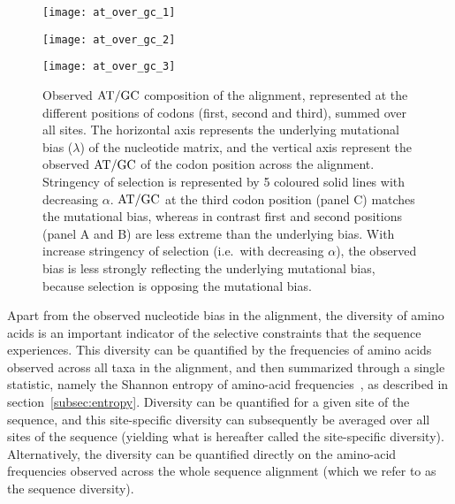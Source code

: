 \begin{figure}[htbp]
    \centering
    \begin{minipage}{0.32\linewidth}
        \texttt{[image: at\_over\_gc\_1]}
    \end{minipage}
    \hfill
    \begin{minipage}{0.32\linewidth}
        \texttt{[image: at\_over\_gc\_2]}
    \end{minipage}
    \hfill
    \begin{minipage}{0.32\linewidth}
        \texttt{[image: at\_over\_gc\_3]}
    \end{minipage}
    \hfill
    \caption[$\atgc$ composition of the alignment]{
    Observed $\atgc$ composition of the alignment, represented at the different positions of codons (first, second and third), summed over all sites.
    The horizontal axis represents the underlying mutational bias ($\lambda$) of the nucleotide matrix, and the vertical axis represent the observed $\atgc$ of the codon position across the alignment.
    Stringency of selection is represented by 5 coloured solid lines with decreasing $\alpha$.
    $\atgc$ at the third codon position (panel C) matches the mutational bias, whereas in contrast first and second positions (panel A and B) are less extreme than the underlying bias.
    With increase stringency of selection (i.e.~with decreasing $\alpha$), the observed bias is less strongly reflecting the underlying mutational bias, because selection is opposing the mutational bias.}
    \label{fig:mut-bias-AT-GC-obs}
\end{figure}

Apart from the observed nucleotide bias in the alignment, the diversity of amino acids is an important indicator of the selective constraints that the sequence experiences.
This diversity can be quantified by the frequencies of amino acids observed across all taxa in the alignment, and then summarized through a single statistic, namely the Shannon entropy of amino-acid frequencies~\citep{Goldstein2017}, as described in section~\ref{subsec:entropy}.
Diversity can be quantified for a given site of the sequence, and this site-specific diversity can subsequently be averaged over all sites of the sequence (yielding what is hereafter called the site-specific diversity).
Alternatively, the diversity can be quantified directly on the amino-acid frequencies observed across the whole sequence alignment (which we refer to as the sequence diversity).

